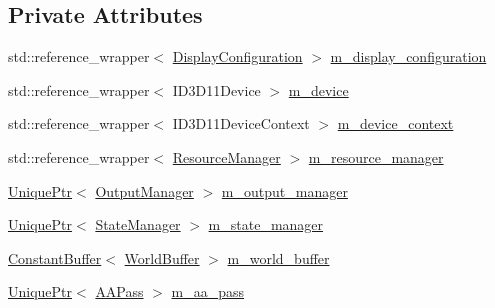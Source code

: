 \subsection*{Private Attributes}
\begin{DoxyCompactItemize}
\item 
std\+::reference\+\_\+wrapper$<$ \mbox{\hyperlink{classmage_1_1rendering_1_1_display_configuration}{Display\+Configuration}} $>$ \mbox{\hyperlink{classmage_1_1rendering_1_1_renderer_1_1_impl_a10cf7a42791591339e7abae67e1a0624}{m\+\_\+display\+\_\+configuration}}
\item 
std\+::reference\+\_\+wrapper$<$ I\+D3\+D11\+Device $>$ \mbox{\hyperlink{classmage_1_1rendering_1_1_renderer_1_1_impl_acbd7937a78edf6a8c3f24fc0a300216b}{m\+\_\+device}}
\item 
std\+::reference\+\_\+wrapper$<$ I\+D3\+D11\+Device\+Context $>$ \mbox{\hyperlink{classmage_1_1rendering_1_1_renderer_1_1_impl_a4ab027121f4d0fd9ab8f35f5d2fcfca6}{m\+\_\+device\+\_\+context}}
\item 
std\+::reference\+\_\+wrapper$<$ \mbox{\hyperlink{classmage_1_1rendering_1_1_resource_manager}{Resource\+Manager}} $>$ \mbox{\hyperlink{classmage_1_1rendering_1_1_renderer_1_1_impl_a4e128f17ff567e4af890c730c6357c94}{m\+\_\+resource\+\_\+manager}}
\item 
\mbox{\hyperlink{namespacemage_a3316d7143a973e37adf1110f2e80ca31}{Unique\+Ptr}}$<$ \mbox{\hyperlink{classmage_1_1rendering_1_1_output_manager}{Output\+Manager}} $>$ \mbox{\hyperlink{classmage_1_1rendering_1_1_renderer_1_1_impl_a177cc2fc2cab6c39fc26046e1bea8b97}{m\+\_\+output\+\_\+manager}}
\item 
\mbox{\hyperlink{namespacemage_a3316d7143a973e37adf1110f2e80ca31}{Unique\+Ptr}}$<$ \mbox{\hyperlink{classmage_1_1rendering_1_1_state_manager}{State\+Manager}} $>$ \mbox{\hyperlink{classmage_1_1rendering_1_1_renderer_1_1_impl_a403fbd5958b798e426683c6d671b056c}{m\+\_\+state\+\_\+manager}}
\item 
\mbox{\hyperlink{classmage_1_1rendering_1_1_constant_buffer}{Constant\+Buffer}}$<$ \mbox{\hyperlink{structmage_1_1rendering_1_1_world_buffer}{World\+Buffer}} $>$ \mbox{\hyperlink{classmage_1_1rendering_1_1_renderer_1_1_impl_ab108fbff123947defcc47f8cf53425e0}{m\+\_\+world\+\_\+buffer}}
\item 
\mbox{\hyperlink{namespacemage_a3316d7143a973e37adf1110f2e80ca31}{Unique\+Ptr}}$<$ \mbox{\hyperlink{classmage_1_1rendering_1_1_a_a_pass}{A\+A\+Pass}} $>$ \mbox{\hyperlink{classmage_1_1rendering_1_1_renderer_1_1_impl_aeb6351e4bacece7f3682685d74593d18}{m\+\_\+aa\+\_\+pass}}

\end{DoxyCompactItemize}

